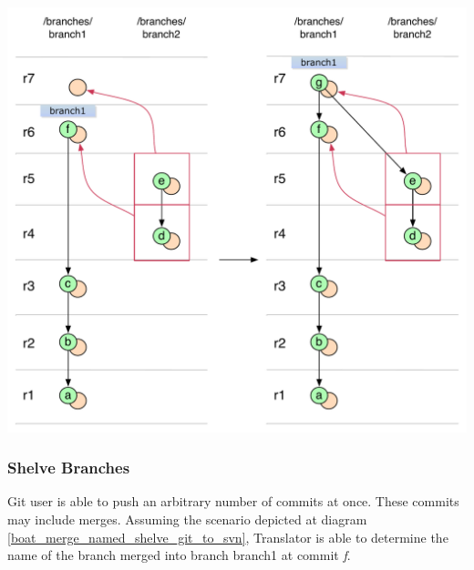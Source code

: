 \begin{center}
\includegraphics[width=\textwidth]{img/diagrams/merge_commit_on_double_cherry_pick_branch_no_parent_svn_to_git.pdf}%
\label{merge_commit_on_double_cherry_pick_branch_no_parent_svn_to_git}%
\end{center}

\subsubsection{Shelve Branches}

Git user is able to push an arbitrary number of commits at once. These commits may include merges. Assuming the scenario depicted at diagram \ref{boat_merge_named_shelve_git_to_svn}, Translator is able to determine the name of the branch merged into branch branch1 at commit \emph{f}.

